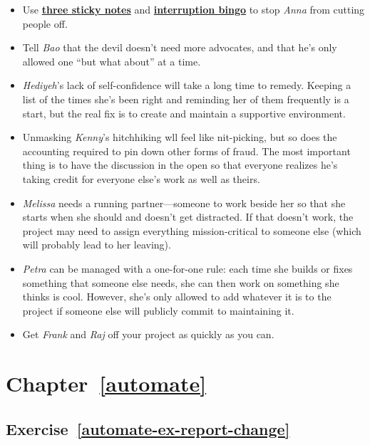 \documentclass[
]{krantz}
\newcommand{\gref}[2]{\hyperlink{#2}{\textbf{#1}}}
\begin{document}
\begin{itemize}
\item
  Use \gref{three sticky notes}{three\_stickies}
  and \gref{interruption bingo}{interruption\_bingo}
  to stop \emph{Anna} from cutting people off.
\item
  Tell \emph{Bao} that the devil doesn't need more advocates,
  and that he's only allowed one ``but what about'' at a time.
\item
  \emph{Hediyeh}'s lack of self-confidence will take a long time to remedy.
  Keeping a list of the times she's been right
  and reminding her of them frequently is a start,
  but the real fix is to create and maintain a supportive environment.
\item
  Unmasking \emph{Kenny}'s hitchhiking wll feel like nit-picking,
  but so does the accounting required to pin down other forms of fraud.
  The most important thing is to have the discussion in the open
  so that everyone realizes he's taking credit for everyone else's work
  as well as theirs.
\item
  \emph{Melissa} needs a running partner---someone to work beside her
  so that she starts when she should and doesn't get distracted.
  If that doesn't work,
  the project may need to assign everything mission-critical to someone else
  (which will probably lead to her leaving).
\item
  \emph{Petra} can be managed with a one-for-one rule:
  each time she builds or fixes something that someone else needs,
  she can then work on something she thinks is cool.
  However,
  she's only allowed to add whatever it is to the project
  if someone else will publicly commit to maintaining it.
\item
  Get \emph{Frank} and \emph{Raj} off your project as quickly as you can.
\end{itemize}

\hypertarget{chapter-refautomate}{%
\section*{Chapter~\ref{automate}}\label{chapter-refautomate}}

\hypertarget{exercise-refautomate-ex-report-change}{%
\subsection*{Exercise~\ref{automate-ex-report-change}}\label{exercise-refautomate-ex-report-change}}
\end{document}
